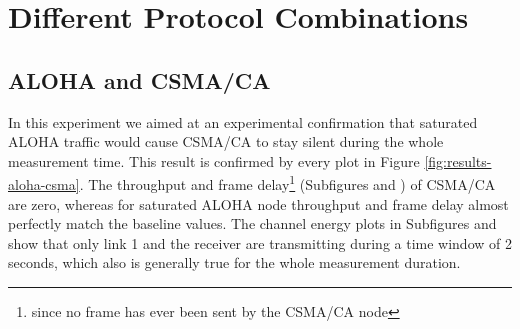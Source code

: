 \clearpage

\section{Different Protocol Combinations}

\subsection{ALOHA and CSMA/CA}
\label{sec:aloha-csma}

In this experiment we aimed at an experimental confirmation that saturated ALOHA traffic would cause CSMA/CA to stay silent during the whole measurement time. This result is confirmed by every plot in Figure \ref{fig:results-aloha-csma}. The throughput and frame delay\footnote{since no frame has ever been sent by the CSMA/CA node} (Subfigures  and ) of CSMA/CA are zero, whereas for saturated ALOHA node throughput and frame delay almost perfectly match the baseline values. The channel energy plots in Subfigures  and  show that only link 1 and the receiver are transmitting during a time window of 2 seconds, which also is generally true for the whole measurement duration. 

